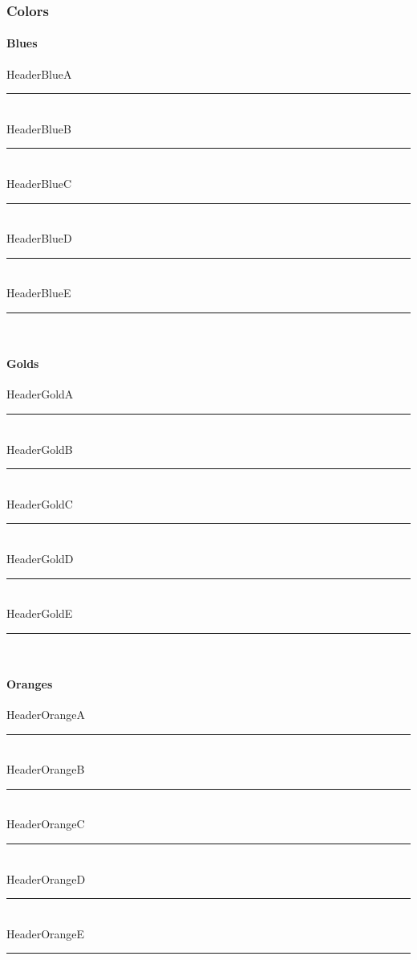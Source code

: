 \subsubsection{Colors}
\paragraph[Blues]{Blues\texorpdfstring{\\}{}}
\textcolor{HeaderBlueA}{HeaderBlueA}
\noindent\textcolor{HeaderBlueA}{\rule{.5\textwidth}{.5mm}}\\
\textcolor{HeaderBlueB}{HeaderBlueB}
\noindent\textcolor{HeaderBlueB}{\rule{.5\textwidth}{.5mm}}\\
\textcolor{HeaderBlueC}{HeaderBlueC}
\noindent\textcolor{HeaderBlueC}{\rule{.5\textwidth}{.5mm}}\\
\textcolor{HeaderBlueD}{HeaderBlueD}
\noindent\textcolor{HeaderBlueD}{\rule{.5\textwidth}{.5mm}}\\
\textcolor{HeaderBlueE}{HeaderBlueE}
\noindent\textcolor{HeaderBlueE}{\rule{.5\textwidth}{.5mm}}\\
\paragraph[Golds]{Golds\texorpdfstring{\\}{}}
\textcolor{HeaderGoldA}{HeaderGoldA}
\noindent\textcolor{HeaderGoldA}{\rule{.5\textwidth}{.5mm}}\\
\textcolor{HeaderGoldB}{HeaderGoldB}
\noindent\textcolor{HeaderGoldB}{\rule{.5\textwidth}{.5mm}}\\
\textcolor{HeaderGoldC}{HeaderGoldC}
\noindent\textcolor{HeaderGoldC}{\rule{.5\textwidth}{.5mm}}\\
\textcolor{HeaderGoldD}{HeaderGoldD}
\noindent\textcolor{HeaderGoldD}{\rule{.5\textwidth}{.5mm}}\\
\textcolor{HeaderGoldE}{HeaderGoldE}
\noindent\textcolor{HeaderGoldE}{\rule{.5\textwidth}{.5mm}}\\
\paragraph[Oranges]{Oranges\texorpdfstring{\\}{}}
\textcolor{HeaderOrangeA}{HeaderOrangeA}
\noindent\textcolor{HeaderOrangeA}{\rule{.5\textwidth}{.5mm}}\\
\textcolor{HeaderOrangeB}{HeaderOrangeB}
\noindent\textcolor{HeaderOrangeB}{\rule{.5\textwidth}{.5mm}}\\
\textcolor{HeaderOrangeC}{HeaderOrangeC}
\noindent\textcolor{HeaderOrangeC}{\rule{.5\textwidth}{.5mm}}\\
\textcolor{HeaderOrangeD}{HeaderOrangeD}
\noindent\textcolor{HeaderOrangeD}{\rule{.5\textwidth}{.5mm}}\\
\textcolor{HeaderOrangeE}{HeaderOrangeE}
\noindent\textcolor{HeaderOrangeE}{\rule{.5\textwidth}{.5mm}}\\
